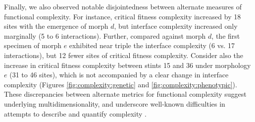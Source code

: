 Finally, we also observed notable disjointedness between alternate measures of functional complexity.
For instance, critical fitness complexity increased by 18 sites with the emergence of morph $d$, but interface complexity increased only marginally (5 to 6 interactions).
Further, compared against morph $d$, the first specimen of morph $e$ exhibited near triple the interface complexity (6 vs. 17 interactions), but 12 fewer sites of critical fitness complexity.
Consider also the increase in critical fitness complexity between stints 15 and 36 under morphology $e$ (31 to 46 sites), which is not accompanied by a clear change in interface complexity (Figures \ref{fig:complexity:genetic} and \ref{fig:complexity:phenotypic}).
These discrepancies between alternate metrics for functional complexity suggest underlying multidimensionality, and underscore well-known difficulties in attempts to describe and quantify complexity \citep{bottcher2018molecules}.
